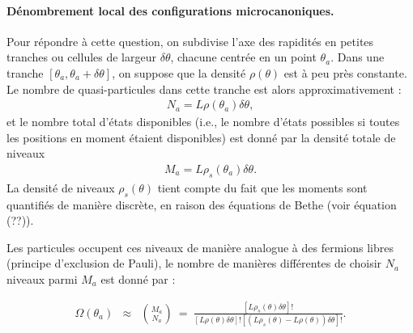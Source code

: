 \paragraph{Dénombrement local des configurations microcanoniques.}
Pour répondre à cette question, on subdivise l’axe des rapidités en petites tranches ou cellules de largeur $\delta \theta$, chacune centrée en un point $\theta_a$. Dans une tranche $[\theta_a, \theta_a + \delta\theta]$, on suppose que la densité $\rho(\theta)$ est à peu près constante. Le nombre de quasi-particules dans cette tranche est alors approximativement :
\begin{eqnarray*}
	N_a = L\rho(\theta_a) \delta \theta,
\end{eqnarray*}
et le nombre total d'états disponibles (i.e., le nombre d’états possibles si toutes les positions en moment étaient disponibles) est donné par la densité totale de niveaux 
\begin{eqnarray*}
	M_a = L\rho_s(\theta_a) \delta \theta.
\end{eqnarray*}
La densité de niveaux $\rho_s(\theta)$ tient compte du fait que les moments sont quantifiés de manière discrète, en raison des équations de Bethe (voir équation (??)).

Les particules occupent ces niveaux de manière analogue à des fermions libres (principe d’exclusion de Pauli), le nombre de manières différentes de choisir $N_a$ niveaux parmi $M_a$ est donné par :
	
	
	\begin{figure}[H]
		\centering 
		\captionsetup{skip=10pt} %
	\end{figure}
	
	
\begin{eqnarray}
	\Omega(\theta_a) & \approx  & \binom{M_a}{N_a} ~= ~   \frac{[ L\rho_s ( \theta ) \delta \theta ] ! }{ [ L\rho ( \theta ) \delta \theta ] ! [( L\rho_s ( \theta ) - L\rho ( \theta ) )  \delta \theta ] ! }. 	
\end{eqnarray}

